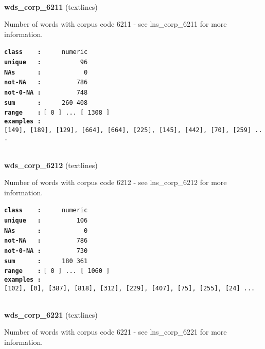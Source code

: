 \documentclass[]{article}
\begin{document}
~

\textbf{wds\_corp\_6211} (textlines)

Number of words with corpus code 6211 - see lns\_corp\_6211 for more
information.

\textbf{\texttt{class\ \ \ \ :}} \texttt{~~~~~numeric}\\
\textbf{\texttt{unique\ \ \ :}} \texttt{~~~~~~~~~~96}\\
\textbf{\texttt{NAs\ \ \ \ \ \ :}} \texttt{~~~~~~~~~~~0}\\
\textbf{\texttt{not-NA\ \ \ :}} \texttt{~~~~~~~~~786}\\
\textbf{\texttt{not-0-NA\ :}} \texttt{~~~~~~~~~748}\\
\textbf{\texttt{sum\ \ \ \ \ \ :}} \texttt{~~~~~260~408}\\
\textbf{\texttt{range\ \ \ \ :}}
\texttt{{[}\ 0\ {]}\ ...\ {[}\ 1308\ {]}}\\
\textbf{\texttt{examples\ :}}
\texttt{{[}149{]},\ {[}189{]},\ {[}129{]},\ {[}664{]},\ {[}664{]},\ {[}225{]},\ {[}145{]},\ {[}442{]},\ {[}70{]},\ {[}259{]}\ ...}\\

~

\textbf{wds\_corp\_6212} (textlines)

Number of words with corpus code 6212 - see lns\_corp\_6212 for more
information.

\textbf{\texttt{class\ \ \ \ :}} \texttt{~~~~~numeric}\\
\textbf{\texttt{unique\ \ \ :}} \texttt{~~~~~~~~~106}\\
\textbf{\texttt{NAs\ \ \ \ \ \ :}} \texttt{~~~~~~~~~~~0}\\
\textbf{\texttt{not-NA\ \ \ :}} \texttt{~~~~~~~~~786}\\
\textbf{\texttt{not-0-NA\ :}} \texttt{~~~~~~~~~730}\\
\textbf{\texttt{sum\ \ \ \ \ \ :}} \texttt{~~~~~180~361}\\
\textbf{\texttt{range\ \ \ \ :}}
\texttt{{[}\ 0\ {]}\ ...\ {[}\ 1060\ {]}}\\
\textbf{\texttt{examples\ :}}
\texttt{{[}102{]},\ {[}0{]},\ {[}387{]},\ {[}818{]},\ {[}312{]},\ {[}229{]},\ {[}407{]},\ {[}75{]},\ {[}255{]},\ {[}24{]}\ ...}\\

~

\textbf{wds\_corp\_6221} (textlines)

Number of words with corpus code 6221 - see lns\_corp\_6221 for more
information.
\end{document}
